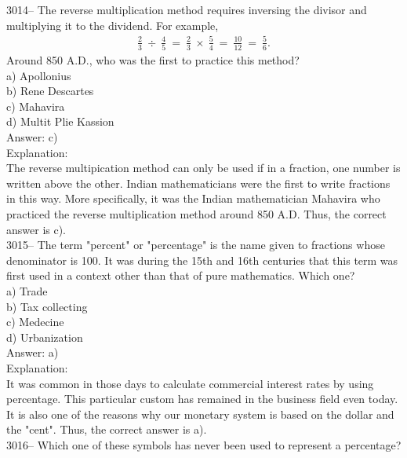 \documentclass[letterpaper, 12pt]{article}
\begin{document}
3014-- The reverse multiplication method requires inversing the divisor and multiplying it to the dividend. For example,
\begin{eqnarray*}
\frac{2}{3} \ \div \ \frac{4}{5} \ = \ \frac{2}{3} \ \times \ \frac{5}{4} \ = \ \frac{10}{12} \ = \ \frac{5}{6}.
\end{eqnarray*}
Around 850 A.D., who was the first to practice this method?\\

a) Apollonius\\
b) Rene Descartes\\
c) Mahavira\\
d) Multit Plie Kassion\\

Answer: c)\\

Explanation:\\
The reverse multipication method can only be used if in a fraction, one number is written above the other. Indian mathematicians were the first to write fractions in this way. More specifically, it was the Indian mathematician Mahavira who practiced the reverse multiplication method around 850 A.D. Thus, the correct answer is c).\\



3015-- The term "percent" or "percentage" is the name given to fractions whose denominator is 100. It was during the 15th and 16th centuries that this term was first used in a context other than that of pure mathematics. Which one?\\

a) Trade\\
b) Tax collecting\\
c) Medecine\\
d) Urbanization\\

Answer: a)\\

Explanation:\\
It was common in those days to calculate commercial interest rates by using percentage. This particular custom has remained in the business field even today. It is also one of the reasons why our monetary system is based on the dollar and the "cent". Thus, the correct answer is a).\\



3016-- Which one of these symbols has never been used to represent a percentage?\\
\end{document}
